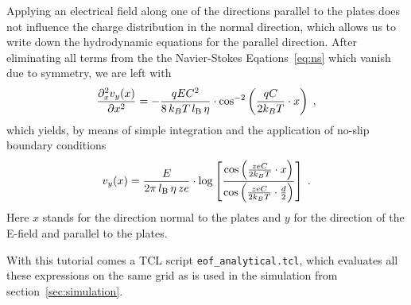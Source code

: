 Applying an electrical field along one of the directions
parallel to the plates does not influence the charge distribution in the normal direction, which allows us to write down the hydrodynamic equations for the parallel direction. After eliminating all terms from the the Navier-Stokes Eqations~\eqref{eq:ns} which vanish due to symmetry, we are left with
\begin{align}
  \frac{\partial_x^2 v_y(x)}{\partial x^2} = -\frac{q E C^2}{8 \, \kT \, \lb \, \eta} \cdot \cos^{-2} \left( \frac{qC}{2 \kT} \cdot x \right) \; ,
\end{align}
which yields, by means of simple integration and the application of no-slip
boundary conditions
\begin{align}
  v_y(x) = \frac{E}{2 \pi \, \lb \, \eta \, ze} \cdot \log \left[ \frac{\cos \left( \frac{zeC}{2 \kT} \cdot x \right)}{\cos \left( \frac{zeC}{2 \kT} \cdot \frac d 2 \right)} \right] \; .
\end{align}
Here $x$ stands for the direction normal to the plates and $y$ for the direction of the
E-field and parallel to the plates.

With this tutorial comes a TCL script \texttt{eof\_analytical.tcl}, which evaluates all these expressions on the same grid as is used in the simulation from section~\ref{sec:simulation}.

\pagebreak
